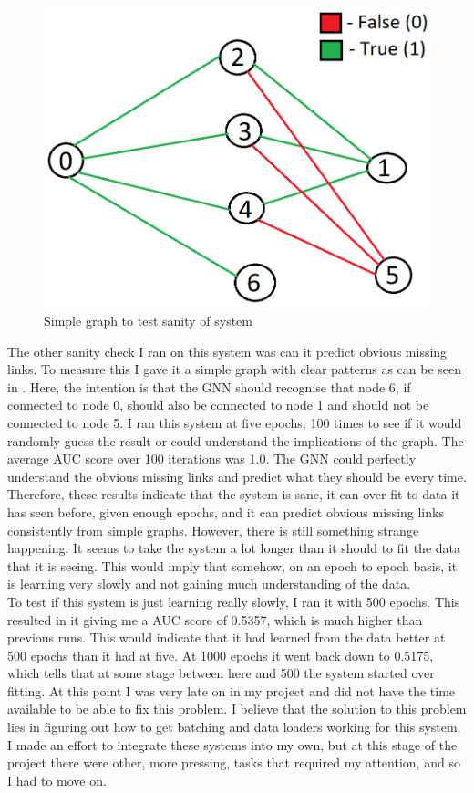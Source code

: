 \documentclass{l4proj}
\begin{document}
\begin{figure}[h]
    \centering
    \includegraphics[width=0.5\linewidth]{images/sanity_graph.png}
    \caption{Simple graph to test sanity of system}
    \label{fig:sanity_graph}
\end{figure}

The other sanity check I ran on this system was can it predict obvious missing links. To measure this I gave it a simple graph with clear patterns as can be seen in . Here, the intention is that the GNN should recognise that node 6, if connected to node 0, should also be connected to node 1 and should not be connected to node 5. I ran this system at five epochs, 100 times to see if it would randomly guess the result or could understand the implications of the graph. The average AUC score over 100 iterations was 1.0. The GNN could perfectly understand the obvious missing links and predict what they should be every time. \\

Therefore, these results indicate that the system is sane, it can over-fit to data it has seen before, given enough epochs, and it can predict obvious missing links consistently from simple graphs. However, there is still something strange happening. It seems to take the system a lot longer than it should to fit the data that it is seeing. This would imply that somehow, on an epoch to epoch basis, it is learning very slowly and not gaining much understanding of the data. \\

To test if this system is just learning really slowly, I ran it with 500 epochs. This resulted in it giving me a AUC score of 0.5357, which is much higher than previous runs. This would indicate that it had learned from the data better at 500 epochs than it had at five. At 1000 epochs it went back down to 0.5175, which tells that at some stage between here and 500 the system started over fitting. At this point I was very late on in my project and did not have the time available to be able to fix this problem. I believe that the solution to this problem lies in figuring out how to get batching and data loaders working for this system. I made an effort to integrate these systems into my own, but at this stage of the project there were other, more pressing, tasks that required my attention, and so I had to move on. \\
\end{document}
